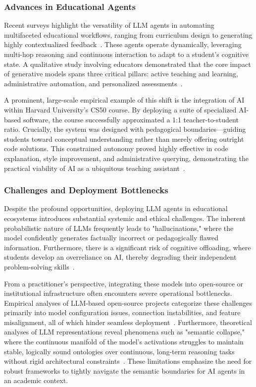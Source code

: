 \subsubsection*{Advances in Educational Agents}
Recent surveys highlight the versatility of LLM agents in automating multifaceted educational workflows, ranging from curriculum design to generating highly contextualized 
feedback~\cite{llm_in_edu}. These agents operate dynamically, leveraging multi-hop reasoning and continuous interaction to adapt to a student's cognitive state. A qualitative study involving educators demonstrated that the core impact of generative models spans three critical pillars: active teaching and learning, administrative automation, and personalized assessments~\cite{AI_in_Edu}. 

A prominent, large-scale empirical example of this shift is the integration of AI within Harvard University's CS50 course. By deploying a suite of specialized 
AI-based software, the course successfully approximated a 1:1 teacher-to-student ratio. Crucially, the system was designed with pedagogical boundaries—guiding 
students toward conceptual understanding rather than merely offering outright code solutions. This constrained autonomy proved highly effective in code explanation, 
style improvement, and administrative querying, demonstrating the practical viability of AI as a ubiquitous teaching assistant~\cite{ai_4_CS50}.

\subsubsection*{Challenges and Deployment Bottlenecks}
Despite the profound opportunities, deploying LLM agents in educational ecosystems introduces substantial systemic and ethical challenges. The inherent probabilistic 
nature of LLMs frequently leads to "hallucinations," where the model confidently generates factually incorrect or pedagogically flawed information. Furthermore, 
there is a significant risk of cognitive offloading, where students develop an overreliance on AI, thereby degrading their independent problem-solving 
skills~\cite{llm_in_edu}. 

From a practitioner's perspective, integrating these models into open-source or institutional infrastructure often encounters severe operational bottlenecks. 
Empirical analyses of LLM-based open-source projects categorize these challenges primarily into model configuration issues, connection instabilities, and feature 
misalignment, all of which hinder seamless deployment~\cite{open_source_isue}. Furthermore, theoretical analyses of LLM representations reveal phenomena such as 
"semantic collapse," where the continuous manifold of the model's activations struggles to maintain stable, logically sound ontologies over continuous, long-term 
reasoning tasks without rigid architectural constraints~\cite{semantic_collapse}. These limitations emphasize the need for robust frameworks to 
tightly navigate the semantic boundaries for AI agents in an academic context.

